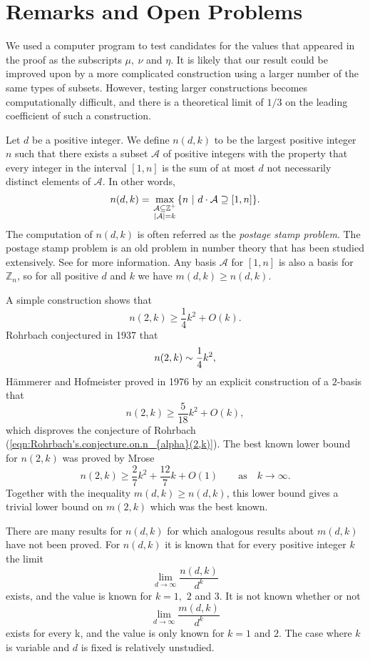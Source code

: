 \documentclass[11pt]{article}
\theoremstyle{definition}
\def\Z{\mbox{$\mathbb Z$}}
\begin{document}
\section{Remarks and Open Problems}

We used a computer program to test candidates for the values that appeared in the proof as the subscripts $\mu,\ \nu$ and $\eta$.  It is likely that our result could be improved upon by a more complicated construction using a larger number of the same types of subsets.  However, testing larger constructions becomes computationally difficult, and there is a theoretical limit of $1/3$ on the leading coefficient of such a construction.

 Let $d$ be a positive integer. We define $n(d, k)$ to be the largest positive integer $n$ such that there exists a subset $\mathcal{A}$ of positive integers with the property that every integer in the interval $[1, n]$ is the sum of at most $d$ not necessarily distinct elements of $\mathcal{A}$. In other words, 
\[
n(d, k) = \max_{\scriptstyle \mathcal{A}\subseteq\mathbb Z^{+}\atop\scriptstyle |\mathcal{A}|=k}\{n\  |\ d\cdot \mathcal{A}\supseteq[1, n]\}.
\]
The computation of  $n(d, k)$ is often referred as the \emph{postage stamp problem}. The postage stamp problem is an old problem in number theory that has been studied extensively. See \cite{Hsu-Jia:CombinatorialNetworks,Selmer:1986a,Selmer:1986b} for more information. Any basis $\mathcal{A}$ for $[1, n]$ is also a basis for $\Z_n$, so for all positive $d$ and $k$ we have $m(d, k) \geq n(d, k)$.


A simple construction shows that 
\[
n(2,k)\ge \frac14k^{2}+O(k).
\]
 Rohrbach \cite{Rohrbach:1937a} conjectured in 1937 that
\begin{equation}\label{eqn:Rohrbach's.conjecture.on.n_{alpha}(2,k)}
n(2,k)\sim\frac14{k^2},
\end{equation}
H\"ammerer and Hofmeister \cite{Hammerer-Hofmeister:1976} proved in
1976 by an explicit construction
of a $2$-basis that
\[
n(2,k)\ge \frac {5}{18}{k^2}+O(k),
\]
which disproves the conjecture of Rohrbach
(\ref{eqn:Rohrbach's.conjecture.on.n_{alpha}(2,k)}).
The  best known lower bound for $n(2,k)$ was proved by Mrose \cite{Mrose1979}
\[
n(2, k) \geq \frac{2}{7}k^2 + \frac{12}{7}k + O(1)\qquad  \text{as}\quad  k \to \infty.
\]
 Together with the inequality $m(d, k) \geq n(d, k)$, this lower bound gives a trivial lower bound on $m(2, k)$ which was the best known. 

There are many results for $n(d,k)$ for which analogous results about $m(d,k)$ have not been proved.
For $n(d,k)$ it is known that for every positive integer $k$ the limit 
\[
\lim_{d \to \infty}{\frac{n(d,k)}{d^k}}
\]
exists, and the value is known for $k = 1,$ $2$ and $3$.  It is not known whether or not 
\[
\lim_{d \to \infty}{\frac{m(d,k)}{d^k}}
\]
exists for every k, and the value is only known for $k = 1$ and $2$. The case where $k$ is variable and $d$ is fixed is relatively unstudied.

	
		
\end{document}
